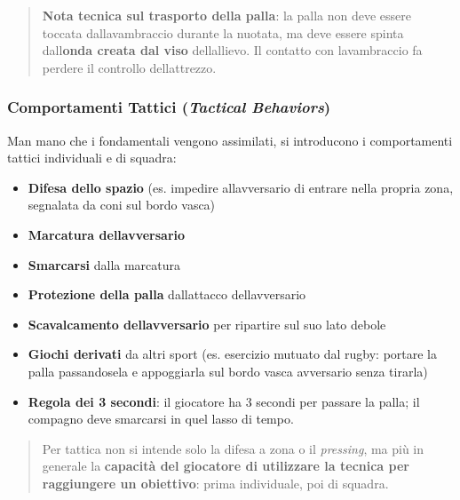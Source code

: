 \documentclass[a4paper,11pt]{article}
\providecommand{\tightlist}{%
  \setlength{\itemsep}{0pt}\setlength{\parskip}{0pt}}
\begin{document}
\begin{quote}
      \textbf{Nota tecnica sul trasporto della palla}: la palla non deve
      essere toccata dall\textquotesingle avambraccio durante la nuotata, ma
      deve essere spinta dall\textquotesingle{}\textbf{onda creata dal viso}
      dell\textquotesingle allievo. Il contatto con
      l\textquotesingle avambraccio fa perdere il controllo
      dell\textquotesingle attrezzo.
\end{quote}

\subsubsection{\texorpdfstring{Comportamenti Tattici (\emph{Tactical
                  Behaviors})}{Comportamenti Tattici (Tactical Behaviors)}}\label{comportamenti-tattici-tactical-behaviors}

Man mano che i fondamentali vengono assimilati, si introducono i
comportamenti tattici individuali e di squadra:

\begin{itemize}
      \tightlist
      \item
            \textbf{Difesa dello spazio} (es. impedire
            all\textquotesingle avversario di entrare nella propria zona,
            segnalata da coni sul bordo vasca)
      \item
            \textbf{Marcatura dell\textquotesingle avversario}
      \item
            \textbf{Smarcarsi} dalla marcatura
      \item
            \textbf{Protezione della palla} dall\textquotesingle attacco
            dell\textquotesingle avversario
      \item
            \textbf{Scavalcamento dell\textquotesingle avversario} per ripartire
            sul suo lato debole
      \item
            \textbf{Giochi derivati} da altri sport (es. esercizio mutuato dal
            rugby: portare la palla passandosela e appoggiarla sul bordo vasca
            avversario senza tirarla)
      \item
            \textbf{Regola dei 3 secondi}: il giocatore ha 3 secondi per passare
            la palla; il compagno deve smarcarsi in quel lasso di tempo.
\end{itemize}

\begin{quote}
      Per tattica non si intende solo la difesa a zona o il \emph{pressing},
      ma più in generale la \textbf{capacità del giocatore di utilizzare la
            tecnica per raggiungere un obiettivo}: prima individuale, poi di
      squadra.
\end{quote}
\end{document}
